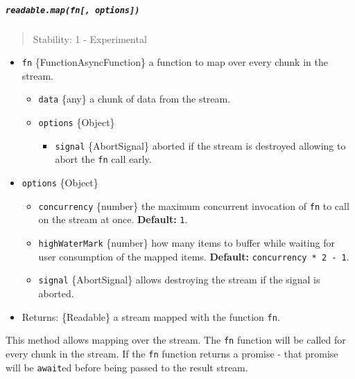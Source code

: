 \subparagraph{\texorpdfstring{\texttt{readable.map(fn{[},\ options{]})}}{readable.map(fn{[}, options{]})}}\label{readable.mapfn-options}

\begin{quote}
Stability: 1 - Experimental
\end{quote}

\begin{itemize}
\tightlist
\item
  \texttt{fn} \{Function\textbar AsyncFunction\} a function to map over
  every chunk in the stream.

  \begin{itemize}
  \tightlist
  \item
    \texttt{data} \{any\} a chunk of data from the stream.
  \item
    \texttt{options} \{Object\}

    \begin{itemize}
    \tightlist
    \item
      \texttt{signal} \{AbortSignal\} aborted if the stream is destroyed
      allowing to abort the \texttt{fn} call early.
    \end{itemize}
  \end{itemize}
\item
  \texttt{options} \{Object\}

  \begin{itemize}
  \tightlist
  \item
    \texttt{concurrency} \{number\} the maximum concurrent invocation of
    \texttt{fn} to call on the stream at once. \textbf{Default:}
    \texttt{1}.
  \item
    \texttt{highWaterMark} \{number\} how many items to buffer while
    waiting for user consumption of the mapped items. \textbf{Default:}
    \texttt{concurrency\ *\ 2\ -\ 1}.
  \item
    \texttt{signal} \{AbortSignal\} allows destroying the stream if the
    signal is aborted.
  \end{itemize}
\item
  Returns: \{Readable\} a stream mapped with the function \texttt{fn}.
\end{itemize}

This method allows mapping over the stream. The \texttt{fn} function
will be called for every chunk in the stream. If the \texttt{fn}
function returns a promise - that promise will be \texttt{await}ed
before being passed to the result stream.

